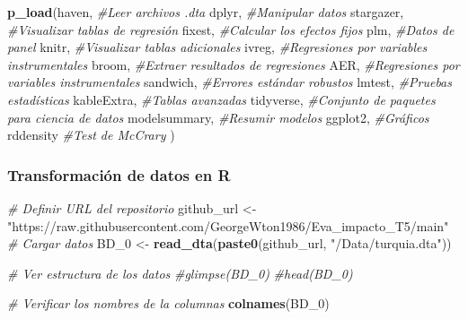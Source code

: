 \documentclass[
]{article}
\newenvironment{Shaded}{\begin{snugshade}}{\end{snugshade}}
\newcommand{\CommentTok}[1]{\textcolor[rgb]{0.56,0.35,0.01}{\textit{#1}}}
\newcommand{\FunctionTok}[1]{\textcolor[rgb]{0.13,0.29,0.53}{\textbf{#1}}}
\newcommand{\NormalTok}[1]{#1}
\newcommand{\OtherTok}[1]{\textcolor[rgb]{0.56,0.35,0.01}{#1}}
\newcommand{\StringTok}[1]{\textcolor[rgb]{0.31,0.60,0.02}{#1}}
\begin{document}
\begin{Shaded}
\begin{Highlighting}[]
\FunctionTok{p\_load}\NormalTok{(haven,   }\CommentTok{\#Leer archivos .dta}
\NormalTok{      dplyr,    }\CommentTok{\#Manipular datos}
\NormalTok{      stargazer,  }\CommentTok{\#Visualizar tablas de regresión}
\NormalTok{      fixest,   }\CommentTok{\#Calcular los efectos fijos}
\NormalTok{      plm,  }\CommentTok{\#Datos de panel}
\NormalTok{      knitr,   }\CommentTok{\#Visualizar tablas adicionales}
\NormalTok{      ivreg,  }\CommentTok{\#Regresiones por variables instrumentales}
\NormalTok{      broom, }\CommentTok{\#Extraer resultados de regresiones}
\NormalTok{      AER,    }\CommentTok{\#Regresiones por variables instrumentales}
\NormalTok{      sandwich, }\CommentTok{\#Errores estándar robustos}
\NormalTok{      lmtest,  }\CommentTok{\#Pruebas estadísticas}
\NormalTok{      kableExtra, }\CommentTok{\#Tablas avanzadas}
\NormalTok{      tidyverse, }\CommentTok{\#Conjunto de paquetes para ciencia de datos}
\NormalTok{      modelsummary, }\CommentTok{\#Resumir modelos}
\NormalTok{      ggplot2, }\CommentTok{\#Gráficos}
\NormalTok{      rddensity }\CommentTok{\#Test de McCrary}
\NormalTok{      )}
\end{Highlighting}
\end{Shaded}

\subsubsection{Transformación de datos en
R}\label{transformaciuxf3n-de-datos-en-r}

\begin{Shaded}
\begin{Highlighting}[]
\CommentTok{\# Definir URL del repositorio}
\NormalTok{github\_url }\OtherTok{\textless{}{-}} \StringTok{"https://raw.githubusercontent.com/GeorgeWton1986/Eva\_impacto\_T5/main"}
\CommentTok{\# Cargar datos}
\NormalTok{BD\_0 }\OtherTok{\textless{}{-}} \FunctionTok{read\_dta}\NormalTok{(}\FunctionTok{paste0}\NormalTok{(github\_url, }\StringTok{"/Data/turquia.dta"}\NormalTok{))}


\CommentTok{\# Ver estructura de los datos}
\CommentTok{\#glimpse(BD\_0)}
\CommentTok{\#head(BD\_0)}

\CommentTok{\# Verificar los nombres de la columnas}
\FunctionTok{colnames}\NormalTok{(BD\_0)}
\end{Highlighting}
\end{Shaded}
\end{document}
